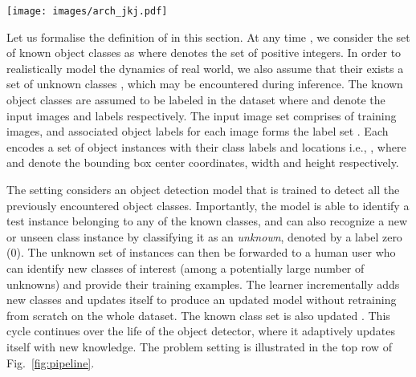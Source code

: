 \documentclass[final]{cvpr}
\begin{document}
\begin{figure*}[t]
\centering
\begin{minipage}[]{0.75\textwidth}
\texttt{[image: images/arch\_jkj.pdf]}
\end{minipage}
\begin{minipage}[]{0.24\textwidth}
\label{fig:pipeline}
\end{minipage}
\vspace{-5pt}
\end{figure*}




Let us formalise the definition of \OWOD in this section.
At any time , we consider the set of known object classes as  where  denotes the set of positive integers. In order to realistically model the dynamics of real world, we also assume that their exists a set of unknown classes  , which may be  encountered during inference. The known object classes  are assumed to be labeled in the dataset   where  and  denote the input images and labels respectively. The input image set comprises of  training images,  and associated object labels for each image forms the label set . Each  encodes a set of  object instances with their class labels and locations i.e., , where  and  denote the bounding box center coordinates, width and height respectively.
 
The \textit{\OWOD} setting considers an object detection model  that is trained to detect all the previously encountered  object classes. Importantly, the model  is able to identify a test instance belonging to any of the known  classes, and can also recognize a new or unseen class instance by classifying it as an \emph{unknown}, 
denoted by a label zero (0). The unknown set of instances  can then be forwarded to a human user who can identify  new classes of interest (among a potentially large number of unknowns) and provide their training examples. The learner incrementally adds  new classes and updates itself to produce an updated model  without retraining from scratch on the whole dataset. The known class set is also updated . This cycle continues over the life of the object detector, where it adaptively updates itself  with new knowledge. 
The problem setting is illustrated in the top row of Fig.~\ref{fig:pipeline}.
\end{document}
